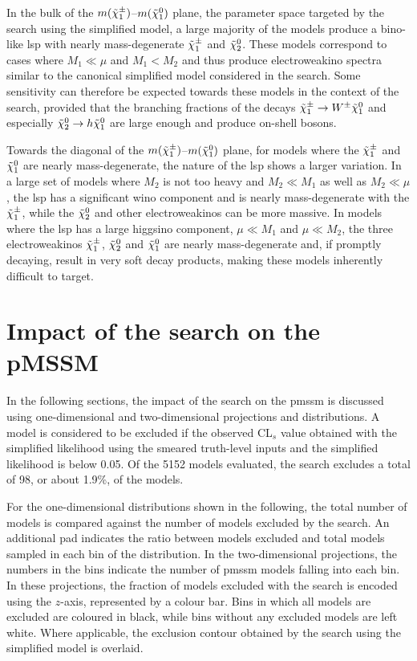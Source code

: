 In the bulk of the $m(\tilde{\chi}_1^\pm)$--$m(\tilde{\chi}_1^0)$ plane, \ie the parameter space targeted by the \onelepton search using the simplified model, a large majority of the models produce a bino-like \gls{lsp} with nearly mass-degenerate $\tilde{\chi}_1^\pm$ and $\tilde{\chi}_2^0$. These models correspond to cases where $M_1 \ll \mu$ and $M_1 < M_2$ and thus produce electroweakino spectra similar to the canonical simplified model considered in the \onelepton search. Some sensitivity can therefore be expected towards these models in the context of the \onelepton search, provided that the branching fractions of the decays $\tilde{\chi}_1^\pm \rightarrow W^\pm \tilde{\chi}_1^0$ and especially $\tilde{\chi}_2^0 \rightarrow h \tilde{\chi}_1^0$ are large enough and produce on-shell bosons.

Towards the diagonal of the $m(\tilde{\chi}_1^\pm)$--$m(\tilde{\chi}_1^0)$ plane, \ie for models where the $\tilde{\chi}_1^\pm$ and $\tilde{\chi}_1^0$ are nearly mass-degenerate, the nature of the \gls{lsp} shows a larger variation.
In a large set of models where $M_2$ is not too heavy and $M_2 \ll M_1$ as well as $M_2 \ll \mu$, the \gls{lsp} has a significant wino component and is nearly mass-degenerate with the $\tilde{\chi}_1^\pm$, while the $\tilde{\chi}_2^0$ and other electroweakinos can be more massive.
In models where the \gls{lsp} has a large higgsino component, \ie $\mu \ll M_1$ and $\mu \ll M_2$, the three electroweakinos $\tilde{\chi}_1^\pm$, $\tilde{\chi}_2^0$ and $\tilde{\chi}_1^0$ are nearly mass-degenerate and, if promptly decaying, result in very soft decay products, making these models inherently difficult to target.

\section{Impact of the search on the pMSSM}

In the following sections, the impact of the \onelepton search on the \gls{pmssm} is discussed using one-dimensional and two-dimensional projections and distributions.
A model is considered to be excluded if the observed CL$_s$ value obtained with the simplified likelihood using the smeared truth-level inputs and the simplified likelihood is below 0.05.
Of the 5152 models evaluated, the \onelepton search excludes a total of 98, or about 1.9\%, of the models.

For the one-dimensional distributions shown in the following, the total number of models is compared against the number of models excluded by the \onelepton search. An additional pad indicates the ratio between models excluded and total models sampled in each bin of the distribution. In the two-dimensional projections, the numbers in the bins indicate the number of \gls{pmssm} models falling into each bin. In these projections, the fraction of models excluded with the \onelepton search is encoded using the $z$-axis, represented by a colour bar. Bins in which all models are excluded are coloured in black, while bins without any excluded models are left white. Where applicable, the exclusion contour obtained by the \onelepton search using the simplified model is overlaid.

